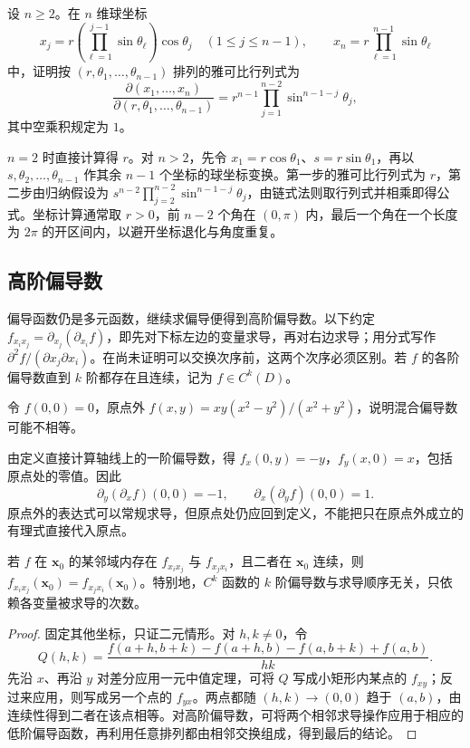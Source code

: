\documentclass[UTF8,12pt,a4paper,fontset=fandol]{ctexbook}
\begin{document}
\begin{example}
\label{ex:hyperspherical-jacobian-ch14}
设 $n\geq2$。在 $n$ 维球坐标
\[
    x_j=r\left(\prod_{\ell=1}^{j-1}\sin\theta_\ell\right)\cos\theta_j
       \quad(1\leq j\leq n-1),\qquad
    x_n=r\prod_{\ell=1}^{n-1}\sin\theta_\ell
\]
中，证明按 $(r,\theta_1,\ldots,\theta_{n-1})$ 排列的雅可比行列式为
\[
    \frac{\partial(x_1,\ldots,x_n)}{\partial(r,\theta_1,\ldots,\theta_{n-1})}
    =r^{n-1}\prod_{j=1}^{n-2}\sin^{n-1-j}\theta_j,
\]
其中空乘积规定为 $1$。
\end{example}
\begin{solve}
$n=2$ 时直接计算得 $r$。对 $n>2$，先令 $x_1=r\cos\theta_1$、$s=r\sin\theta_1$，再以 $s,\theta_2,\ldots,\theta_{n-1}$ 作其余 $n-1$ 个坐标的球坐标变换。第一步的雅可比行列式为 $r$，第二步由归纳假设为 $s^{n-2}\prod_{j=2}^{n-2}\sin^{n-1-j}\theta_j$，由链式法则取行列式并相乘即得公式。坐标计算通常取 $r>0$，前 $n-2$ 个角在 $(0,\pi)$ 内，最后一个角在一个长度为 $2\pi$ 的开区间内，以避开坐标退化与角度重复。
\end{solve}

\subsection{高阶偏导数}
\label{subsec:higher-partial-derivatives}

偏导函数仍是多元函数，继续求偏导便得到高阶偏导数。以下约定 $f_{x_ix_j}=\partial_{x_j}(\partial_{x_i}f)$，即先对下标左边的变量求导，再对右边求导；用分式写作 $\partial^2f/(\partial x_j\partial x_i)$。在尚未证明可以交换次序前，这两个次序必须区别。若 $f$ 的各阶偏导数直到 $k$ 阶都存在且连续，记为 $f\in C^k(D)$。

\begin{example}
\label{ex:unequal-mixed-partials-ch14}
令 $f(0,0)=0$，原点外 $f(x,y)=xy(x^2-y^2)/(x^2+y^2)$，说明混合偏导数可能不相等。
\end{example}
\begin{solve}
由定义直接计算轴线上的一阶偏导数，得 $f_x(0,y)=-y$，$f_y(x,0)=x$，包括原点处的零值。因此
\[
    \partial_y(\partial_xf)(0,0)=-1,\qquad
    \partial_x(\partial_yf)(0,0)=1.
\]
原点外的表达式可以常规求导，但原点处仍应回到定义，不能把只在原点外成立的有理式直接代入原点。
\end{solve}

\begin{theorem}[混合偏导数交换定理]
\label{thm:schwarz-mixed-partials-ch14}
若 $f$ 在 $\boldsymbol x_0$ 的某邻域内存在 $f_{x_ix_j}$ 与 $f_{x_jx_i}$，且二者在 $\boldsymbol x_0$ 连续，则
$f_{x_ix_j}(\boldsymbol x_0)=f_{x_jx_i}(\boldsymbol x_0)$。特别地，$C^k$ 函数的 $k$ 阶偏导数与求导顺序无关，只依赖各变量被求导的次数。
\end{theorem}
\begin{proof}
固定其他坐标，只证二元情形。对 $h,k\ne0$，令
\[
    Q(h,k)=\frac{f(a+h,b+k)-f(a+h,b)-f(a,b+k)+f(a,b)}{hk}.
\]
先沿 $x$、再沿 $y$ 对差分应用一元中值定理，可将 $Q$ 写成小矩形内某点的 $f_{xy}$；反过来应用，则写成另一个点的 $f_{yx}$。两点都随 $(h,k)\to(0,0)$ 趋于 $(a,b)$，由连续性得到二者在该点相等。对高阶偏导数，可将两个相邻求导操作应用于相应的低阶偏导函数，再利用任意排列都由相邻交换组成，得到最后的结论。
\end{proof}
\end{document}
